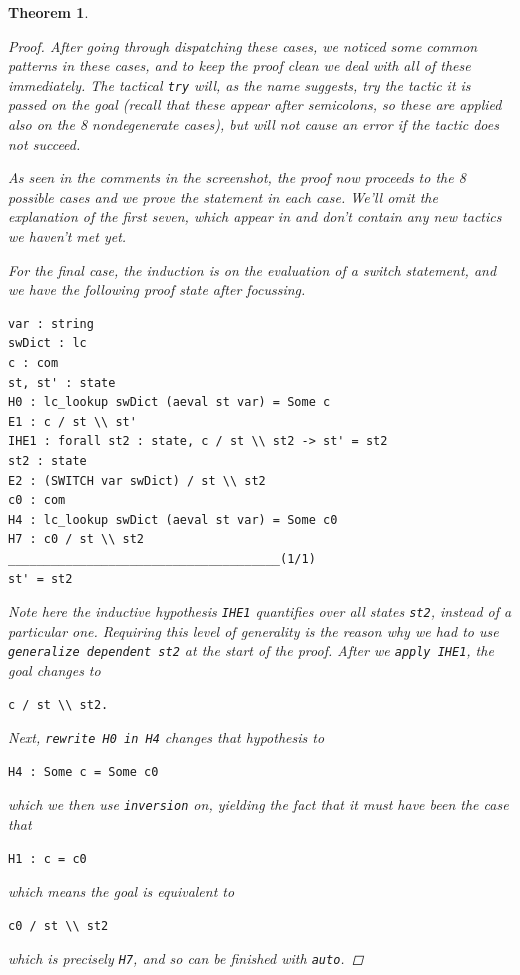 \documentclass[12pt,notitlepage]{report}
\theoremstyle{plain}
\newtheorem{theo}{Theorem}[section]
\theoremstyle{definition}
\numberwithin{equation}{section}
\begin{document}
\begin{theo}
\begin{proof}
\par After going through dispatching these cases, we noticed some common patterns in these cases, and to keep the proof clean we deal with all of these immediately.  The tactical \verb$try$ will, as the name suggests, try the tactic it is passed on the goal (recall that these appear after semicolons, so these are applied also on the 8 nondegenerate cases), but will not cause an error if the tactic does not succeed.
\par As seen in the comments in the screenshot, the proof now proceeds to the 8 possible cases and we prove the statement in each case.  We'll omit the explanation of the first seven, which appear in \cite{Pier} and don't contain any new tactics we haven't met yet.
\par For the final case, the induction is on the evaluation of a switch statement, and we have the following proof state after focussing.
\begin{verbatim}
var : string
swDict : lc
c : com
st, st' : state
H0 : lc_lookup swDict (aeval st var) = Some c
E1 : c / st \\ st'
IHE1 : forall st2 : state, c / st \\ st2 -> st' = st2
st2 : state
E2 : (SWITCH var swDict) / st \\ st2
c0 : com
H4 : lc_lookup swDict (aeval st var) = Some c0
H7 : c0 / st \\ st2
______________________________________(1/1)
st' = st2
\end{verbatim}
Note here the inductive hypothesis \verb$IHE1$ quantifies over all states \verb$st2$, instead of a particular one.  Requiring this level of generality is the reason why we had to use \verb$generalize dependent st2$ at the start of the proof.  After we \verb$apply IHE1$, the goal changes to
\begin{verbatim}
c / st \\ st2.
\end{verbatim}
Next, \verb$rewrite H0 in H4$ changes that hypothesis to
\begin{verbatim}
H4 : Some c = Some c0
\end{verbatim}
which we then use \verb$inversion$ on, yielding the fact that it must have been the case that
\begin{verbatim}
H1 : c = c0
\end{verbatim}
which means the goal is equivalent to
\begin{verbatim}
c0 / st \\ st2
\end{verbatim}
which is precisely \verb$H7$, and so can be finished with \verb$auto$.
\end{proof}
\end{theo}
\end{document}
